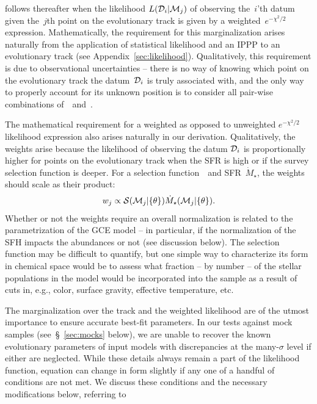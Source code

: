 \documentclass[foo.tex]{subfiles}
\begin{document}
follows thereafter when the likelihood $L(\mathcal{D}_i | \mathcal{M}_j)$ of
observing the~$i$'th datum given the~$j$th point on the evolutionary track is
given by a weighted~$e^{-\chi^2/2}$ expression.
Mathematically, the requirement for this marginalization arises naturally from
the application of statistical likelihood and an IPPP to an evolutionary track
(see Appendix~\ref{sec:likelihood}).
Qualitatively, this requirement is due to observational uncertainties -- there
is no way of knowing which point on the evolutionary track the
datum~$\mathcal{D}_i$ is truly associated with, and the only way to properly
account for its unknown position is to consider all pair-wise combinations
of~~and~.
\par
The mathematical requirement for a weighted as opposed to unweighted
$e^{-\chi^2/2}$ likelihood expression also arises naturally in our derivation.
Qualitatively, the weights arise because the likelihood of observing the datum
$\mathcal{D}_i$ is proportionally higher for points on the evolutionary track
when the SFR is high or if the survey selection function is deeper.
For a selection function~~and SFR~$\dot{M}_\star$, the weights should
scale as their product:
\begin{equation}
w_j \propto \mathcal{S}(\mathcal{M}_j | \{\theta\})
\dot{M}_\star(\mathcal{M}_j | \{\theta\}).
\label{eq:weights}
\end{equation}
Whether or not the weights require an overall normalization is related to the
parametrization of the GCE model -- in particular, if the normalization of the
SFH impacts the abundances or not (see discussion below).
The selection function may be difficult to quantify, but one simple way to
characterize its form in chemical space would be to assess what fraction -- by
number -- of the stellar populations in the model would be incorporated into
the sample as a result of cuts in, e.g., color, surface gravity, effective
temperature, etc.
\par
The marginalization over the track and the weighted likelihood are of the
utmost importance to ensure accurate best-fit parameters.
In our tests against mock samples (see~\S~\ref{sec:mocks} below), we are unable
to recover the known evolutionary parameters of input models with discrepancies
at the many-$\sigma$ level if either are neglected.
While these details always remain a part of the likelihood function, equation
 can change in form slightly if any one of a handful of
conditions are not met.
We discuss these conditions and the necessary modifications below, referring to
\end{document}
